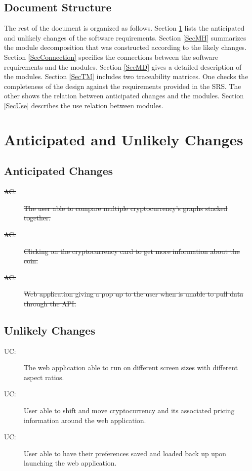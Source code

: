 \documentclass[12pt, titlepage]{article}
\newcounter{acnum}
\newcommand{\actheacnum}{AC\theacnum}
\newcounter{ucnum}
\newcommand{\uctheucnum}{UC\theucnum}
\begin{document}
\subsection{Document Structure}

The rest of the document is organized as follows. Section
\ref{SecChange} lists the anticipated and unlikely changes of the software
requirements. Section \ref{SecMH} summarizes the module decomposition that
was constructed according to the likely changes. Section \ref{SecConnection}
specifies the connections between the software requirements and the
modules. Section \ref{SecMD} gives a detailed description of the
modules. Section \ref{SecTM} includes two traceability matrices. One checks
the completeness of the design against the requirements provided in the SRS. The
other shows the relation between anticipated changes and the modules. Section
\ref{SecUse} describes the use relation between modules.


\section{Anticipated and Unlikely Changes} \label{SecChange}

\subsection{Anticipated Changes} \label{SecAchange}

\begin{description}
\item[\sout{ \actheacnum \label{acMulti}:}] \sout{The user able to compare multiple cryptocurrency's graphs stacked together.}
\item[\sout{ \actheacnum \label{acCoin}:}] \sout{Clicking on the cryptocurrency card to get more information about the coin.}
\item[\sout{ \actheacnum \label{acError}:}] \sout{Web application giving a pop up to the user when is unable to pull data through the API.}
\end{description}

\subsection{Unlikely Changes} \label{SecUchange}

\begin{description}
\item[ \uctheucnum :] The web application able to run on different screen sizes with different aspect ratios.
\item[ \uctheucnum :] User able to shift and move cryptocurrency and its associated pricing information around the web application. 
\item[ \uctheucnum :] User able to have their preferences saved and loaded back up upon launching the web application.
\end{description}
\end{document}
